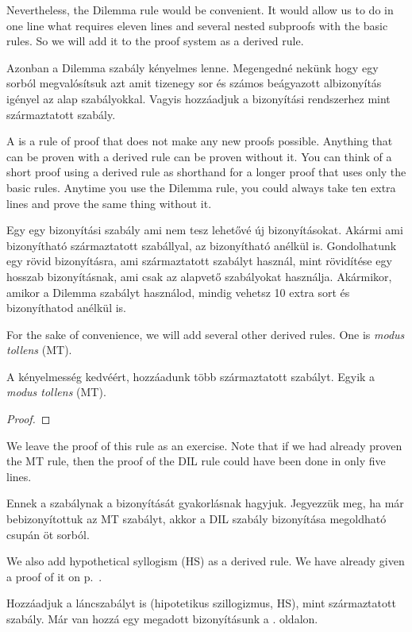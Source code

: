 Nevertheless, the Dilemma rule would be convenient. It would allow us to do in one line what requires eleven lines and several nested subproofs with the basic rules. So we will add it to the proof system as a derived rule.

Azonban a Dilemma szabály kényelmes lenne. Megengedné nekünk hogy egy sorból megvalósítsuk azt amit tizenegy sor és számos beágyazott albizonyítás igényel az alap szabályokkal. Vagyis hozzáadjuk a bizonyítási rendszerhez mint származtatott szabály.

A  is a rule of proof that does not make any new proofs possible. Anything that can be proven with a derived rule can be proven without it. You can think of a short proof using a derived rule as shorthand for a longer proof that uses only the basic rules. Anytime you use the Dilemma rule, you could always take ten extra lines and prove the same thing without it.

Egy  egy bizonyítási szabály ami nem tesz lehetővé új bizonyításokat. Akármi ami bizonyítható származtatott szabállyal, az bizonyítható anélkül is. Gondolhatunk egy rövid bizonyításra, ami származtatott szabályt használ, mint rövidítése egy hosszab bizonyításnak, ami csak az alapvető szabályokat használja. Akármikor, amikor a Dilemma szabályt használod, mindig vehetsz 10 extra sort és bizonyíthatod anélkül is.

For the sake of convenience, we will add several other derived rules. One is \emph{modus tollens} (MT).

A kényelmesség kedvéért, hozzáadunk több származtatott szabályt. Egyik a \emph{modus tollens} (MT).

\begin{proof}
	 
\end{proof}

We leave the proof of this rule as an exercise. Note that if we had already proven the MT rule, then the proof of the DIL rule could have been done in only five lines.

Ennek a szabálynak a bizonyítását gyakorlásnak hagyjuk. Jegyezzük meg, ha már bebizonyítottuk az MT szabályt, akkor a DIL szabály bizonyítása megoldható csupán öt sorból.

We also add hypothetical syllogism (HS) as a derived rule. We have already given a proof of it on p.~\pageref{HSproof}.

Hozzáadjuk a láncszabályt is (hipotetikus szillogizmus, HS), mint származtatott szabály. Már van hozzá egy megadott bizonyításunk a \pageref{HSproof}. oldalon.

